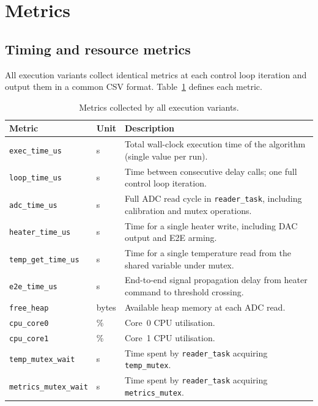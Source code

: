 \documentclass[12pt, a4paper]{report}
\begin{document}
\section{Metrics}
\label{sec:perf-metrics}

\subsection{Timing and resource metrics}
\label{subsec:metric-defs}

All execution variants collect identical metrics at each control loop iteration and output them in a common CSV format. Table~\ref{tab:metrics} defines each metric.

\begin{table}[ht]
\centering
\small
\begin{tabular}{@{}llp{7.5cm}@{}}
\toprule
\textbf{Metric} & \textbf{Unit} & \textbf{Description} \\
\midrule
\texttt{exec\_time\_us} & \textmu{}s & Total wall-clock execution time of the algorithm (single value per run). \\
\texttt{loop\_time\_us} & \textmu{}s & Time between consecutive delay calls; one full control loop iteration. \\
\texttt{adc\_time\_us} & \textmu{}s & Full ADC read cycle in \texttt{reader\_task}, including calibration and mutex operations. \\
\texttt{heater\_time\_us} & \textmu{}s & Time for a single heater write, including DAC output and E2E arming. \\
\texttt{temp\_get\_time\_us} & \textmu{}s & Time for a single temperature read from the shared variable under mutex. \\
\texttt{e2e\_time\_us} & \textmu{}s & End-to-end signal propagation delay from heater command to threshold crossing. \\
\texttt{free\_heap} & bytes & Available heap memory at each ADC read. \\
\texttt{cpu\_core0} & \% & Core~0 CPU utilisation. \\
\texttt{cpu\_core1} & \% & Core~1 CPU utilisation. \\
\texttt{temp\_mutex\_wait} & \textmu{}s & Time spent by \texttt{reader\_task} acquiring \texttt{temp\_mutex}. \\
\texttt{metrics\_mutex\_wait} & \textmu{}s & Time spent by  \texttt{reader\_task} acquiring \texttt{metrics\_mutex}. \\
\bottomrule
\end{tabular}
\caption{Metrics collected by all execution variants.}
\label{tab:metrics}
\end{table}
\end{document}
